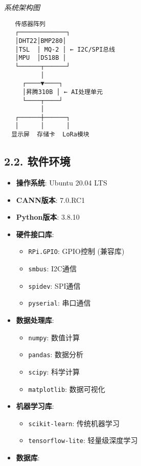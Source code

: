 \emph{系统架构图}

\begin{lstlisting}
   传感器阵列
   ┌─────────────┐
   │DHT22│BMP280│
   │TSL  │ MQ-2 │ ← I2C/SPI总线
   │MPU  │DS18B │
   └──────┬──────┘
          │
     ┌────▼────┐
     │昇腾310B │ ← AI处理单元
     └────┬────┘
          │
   ┌──────┼──────┐
   │      │      │
  显示屏  存储卡  LoRa模块
\end{lstlisting}

\subsection{2.2. 软件环境}\label{ux8f6fux4ef6ux73afux5883}

\begin{itemize}
\tightlist
\item
  \textbf{操作系统}: Ubuntu 20.04 LTS
\item
  \textbf{CANN版本}: 7.0.RC1
\item
  \textbf{Python版本}: 3.8.10
\item
  \textbf{硬件接口库}:

  \begin{itemize}
  \tightlist
  \item
    \passthrough{\lstinline!RPi.GPIO!}: GPIO控制 (兼容库)
  \item
    \passthrough{\lstinline!smbus!}: I2C通信
  \item
    \passthrough{\lstinline!spidev!}: SPI通信
  \item
    \passthrough{\lstinline!pyserial!}: 串口通信
  \end{itemize}
\item
  \textbf{数据处理库}:

  \begin{itemize}
  \tightlist
  \item
    \passthrough{\lstinline!numpy!}: 数值计算
  \item
    \passthrough{\lstinline!pandas!}: 数据分析
  \item
    \passthrough{\lstinline!scipy!}: 科学计算
  \item
    \passthrough{\lstinline!matplotlib!}: 数据可视化
  \end{itemize}
\item
  \textbf{机器学习库}:

  \begin{itemize}
  \tightlist
  \item
    \passthrough{\lstinline!scikit-learn!}: 传统机器学习
  \item
    \passthrough{\lstinline!tensorflow-lite!}: 轻量级深度学习
  \end{itemize}
\item
  \textbf{数据库}:


\end{itemize}
